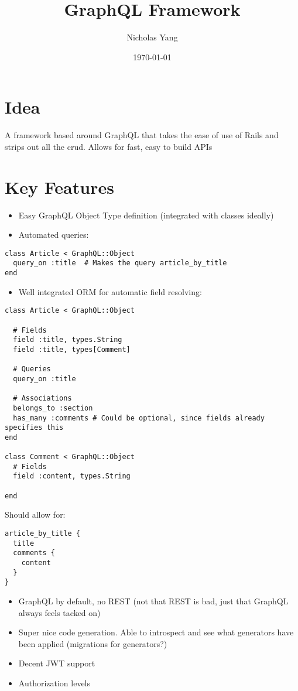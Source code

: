 \documentclass[11pt]{article}
\author{Nicholas Yang}
\date{\today}
\title{GraphQL Framework}
\begin{document}
\maketitle
\tableofcontents


\section{Idea}
\label{sec-1}
A framework based around GraphQL that takes the ease of use of Rails
and strips out all the crud. Allows for fast, easy to build APIs

\section{Key Features}
\label{sec-2}
\begin{itemize}
\item Easy GraphQL Object Type definition (integrated with classes ideally)
\item Automated queries:
\end{itemize}

\begin{verbatim}
class Article < GraphQL::Object
  query_on :title  # Makes the query article_by_title
end
\end{verbatim}

\begin{itemize}
\item Well integrated ORM for automatic field resolving:
\end{itemize}

\begin{verbatim}
class Article < GraphQL::Object

  # Fields
  field :title, types.String
  field :title, types[Comment]

  # Queries
  query_on :title

  # Associations
  belongs_to :section
  has_many :comments # Could be optional, since fields already specifies this
end

class Comment < GraphQL::Object  
  # Fields
  field :content, types.String

end
\end{verbatim}

Should allow for:

\begin{verbatim}
article_by_title {
  title
  comments {
    content
  }
}
\end{verbatim}

\begin{itemize}
\item GraphQL by default, no REST (not that REST is bad, just that GraphQL always feels tacked on)

\item Super nice code generation. Able to introspect and see what generators have been applied (migrations for generators?)

\item Decent JWT support

\item Authorization levels
\end{itemize}
\end{document}
